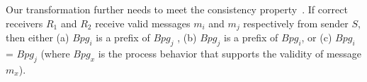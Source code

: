 

Our transformation further needs to meet the consistency property~\cite{clement2012}. If correct receivers $R_1$ and $R_2$ receive valid messages $m_i$ and $m_j$  respectively from sender $S$, then either (a) $Bpg_{i}$ is a prefix of $Bpg_{j}$ , (b) $Bpg_{j}$ is a prefix of $Bpg_{i}$, or (c) $Bpg_{i}$ = $Bpg_{j}$ (where $Bpg_{x}$ is the process behavior that supports the validity of message $m_x$).


